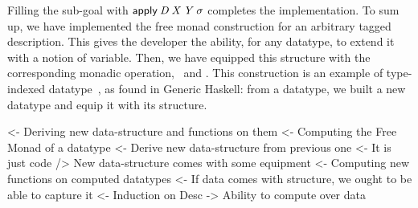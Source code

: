 Filling the sub-goal with $\apply\: \V{D}\: \V{X}\: \V{Y}\:
\V{\sigma}$ completes the implementation. To sum up, we have
implemented the free monad construction for an arbitrary tagged
description. This gives the developer the ability, for any datatype,
to extend it with a notion of variable. Then, we have equipped this
structure with the corresponding monadic operation, \bind\ and
\return. This construction is an example of type-indexed
datatype~\cite{hinze:generic-haskell}, as found in Generic Haskell:
from a datatype, we built a new datatype and equip it with its
structure.

\begin{wstructure}
<- Deriving new data-structure and functions on them
    <- Computing the Free Monad of a datatype
        <- Derive new data-structure from previous one
            <- It is just code
        /> New data-structure comes with some equipment
    <- Computing new functions on computed datatypes
        <- If data comes with structure, we ought to be able to capture it
            <- Induction on Desc
            -> Ability to compute over data
\end{wstructure}

